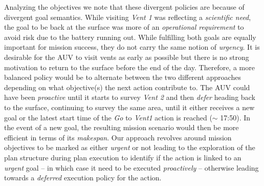 Analyzing the objectives we note that these divergent policies are
because of divergent goal semantics. While visiting {\em Vent 1} was
reflecting a \emph{scientific need}, the goal to be back at the surface
was more of an \emph{operational requirement} to avoid risk due to the
battery running out. While fulfilling both goals are equally important
for mission success, they do not carry the same notion of {\em
  urgency}. It
is desirable for the AUV to visit vents as early as possible but there is
no strong motivation to return to the surface before the end of the
day. Therefore, a more balanced policy would be to alternate between the
two different approaches depending on what objective(s) the next action
contribute to. The AUV could have been {\em proactive} until it starts
to survey {\em Vent 2} and then {\em defer} heading back to the surface,
continuing to survey the same area, until it either receives a new
goal or the latest start time of the {\em Go} to \emph{Vent1} action is
reached ($\sim$ 17:50). In the event of a new goal,
the resulting mission scenario would then be more efficient in terms
of its \emph{makespan}. Our approach revolves around mission
objectives to be marked as either {\em urgent} or not leading to the 
exploration of the plan structure during plan execution to identify if the action
is linked to an {\em urgent} goal -- in which case it need to be
executed {\em proactively} -- otherwise leading towards 
a {\em deferred} execution policy for the action.
 


